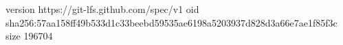 version https://git-lfs.github.com/spec/v1
oid sha256:57aa158ff49b533d1c33beebd59535ae6198a5203937d828d3a66e7ae1f85f3c
size 196704
